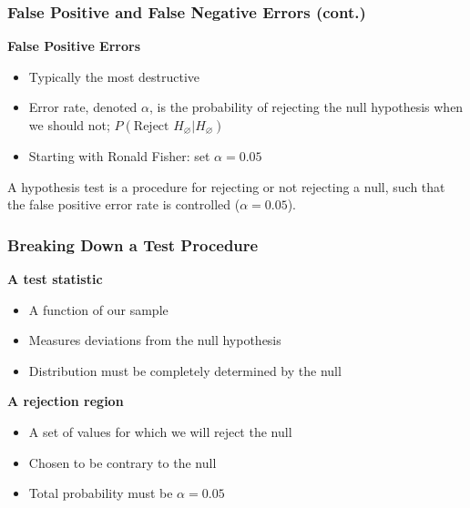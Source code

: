 \documentclass[12pt, block=fill]{beamer}
\begin{document}
\begin{frame}
  \frametitle{False Positive and False Negative Errors (cont.)} 
  \textbf{False Positive Errors}
  \begin{itemize}
    \item Typically the most destructive
  \item Error rate, denoted $\alpha$, is the probability of rejecting
    the null hypothesis when we should not; $P(\text{Reject } H_\varnothing |
    H_\varnothing)$
  \item Starting with Ronald Fisher: set $\alpha = 0.05$
  \end{itemize} 
  
  A hypothesis test is a procedure for rejecting or not rejecting a
  null, such that the false positive error rate is controlled ($\alpha = 0.05$).
\end{frame}


\begin{frame}
  \frametitle{Breaking Down a Test Procedure}
  
  \textbf{A test statistic}
  \begin{itemize}
  \item A function of our sample
  \item Measures deviations from the null hypothesis
  \item Distribution must be completely determined by the null
  \end{itemize}

  \textbf{A rejection region}
  \begin{itemize}
  \item  A set of values for which we will reject the null
  \item  Chosen to be contrary to the null
  \item Total probability must be $\alpha = 0.05$
  \end{itemize}
\end{frame}
\end{document}
